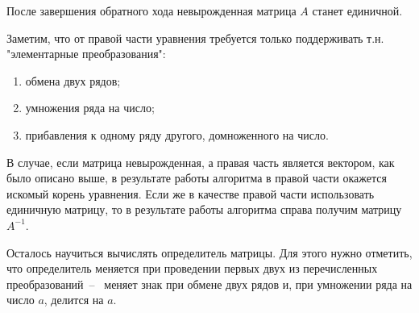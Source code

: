 После завершения обратного хода невырожденная матрица $A$ станет единичной.
\par

Заметим, что от правой части уравнения требуется только поддерживать т.н. "элементарные преобразования":
\begin{enumerate}
    \item обмена двух рядов;
    \item умножения ряда на число;
    \item прибавления к одному ряду другого, домноженного на число.
\end {enumerate}
\par

В случае, если матрица невырожденная, а правая часть является вектором, как было описано выше, в результате работы алгоритма в правой части окажется искомый корень уравнения.
Если же в качестве правой части использовать единичную матрицу, то в результате работы алгоритма справа получим матрицу $A^{-1}$.
\par

Осталось научиться вычислять определитель матрицы. Для этого нужно отметить, что определитель меняется при проведении первых двух из перечисленных преобразований~--~
меняет знак при обмене двух рядов и, при умножении ряда на число $a$, делится на $a$.
